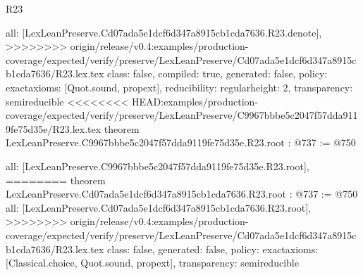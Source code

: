 \begin{lexlean}{R23}
\begin{coremodule}
{{{{{  all: [LexLeanPreserve.Cd07ada5e1dcf6d347a8915cb1cda7636.R23.denote],
>>>>>>>> origin/release/v0.4:examples/production-coverage/expected/verify/preserve/LexLeanPreserve/Cd07ada5e1dcf6d347a8915cb1cda7636/R23.lex.tex
  class: false,
  compiled: true,
  generated: false,
  policy: exact{axioms: [Quot.sound, propext]},
  reducibility: regular{height: 2},
  transparency: semireducible
}
<<<<<<<< HEAD:examples/production-coverage/expected/verify/preserve/LexLeanPreserve/C9967bbbe5c2047f57dda9119fe75d35e/R23.lex.tex
theorem LexLeanPreserve.C9967bbbe5c2047f57dda9119fe75d35e.R23.root : @737 := @750 {
  all: [LexLeanPreserve.C9967bbbe5c2047f57dda9119fe75d35e.R23.root],
========
theorem LexLeanPreserve.Cd07ada5e1dcf6d347a8915cb1cda7636.R23.root : @737 := @750 {
  all: [LexLeanPreserve.Cd07ada5e1dcf6d347a8915cb1cda7636.R23.root],
>>>>>>>> origin/release/v0.4:examples/production-coverage/expected/verify/preserve/LexLeanPreserve/Cd07ada5e1dcf6d347a8915cb1cda7636/R23.lex.tex
  class: false,
  generated: false,
  policy: exact{axioms: [Classical.choice, Quot.sound, propext]},
  transparency: semireducible
}

}}}}}
\end{coremodule}
\end{lexlean}
